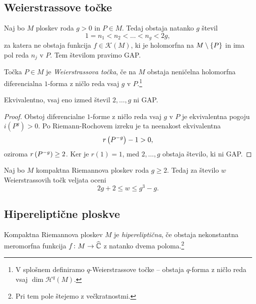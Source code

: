 
\subsection{Weierstrassove točke}

\begin{izrek}
Naj bo $M$ ploskev roda $g > 0$ in $P \in M$. Tedaj obstaja
natanko $g$ števil
\[
1 = n_1 < n_2 < \dots < n_g < 2g,
\]
za katera ne obstaja funkcija $f \in \mathscr{K}(M)$, ki je
holomorfna na $M \setminus \left\{P\right\}$ in ima pol reda $n_j$ v $P$.
Tem številom pravimo GAP.
\end{izrek}


\begin{definicija}
Točka $P \in M$ je \emph{Weierstrassova točka}, če na $M$ obstaja
neničelna holomorfna diferencialna $1$-forma z ničlo reda vsaj
$g$ v $P$.\footnote{V splošnem definiramo $q$-Weierstrassove točke
-- obstaja $q$-forma z ničlo reda vsaj $\dim \mathscr{H}^q(M)$.}
\end{definicija}

\begin{lema}
Ekvivalentno, vsaj eno izmed števil $2, \dots, g$ ni GAP.
\end{lema}

\begin{proof}
Obstoj diferencialne $1$-forme z ničlo reda vsaj $g$ v $P$ je
ekvivalentna pogoju $i(P^g) > 0$. Po Riemann-Rochovem izreku je ta
neenakost ekvivalentna
\[
r \left(P^{-g}\right) - 1 > 0,
\]
oziroma $r \left(P^{-g}\right) \geq 2$. Ker je $r(1) = 1$, med
$2, \dots, g$ obstaja število, ki ni GAP.
\end{proof}

\begin{lema}
Naj bo $M$ kompaktna Riemannova ploskev roda $g \geq 2$. Tedaj za
število $w$ Weierstrassovih točk veljata oceni
\[
2g + 2 \leq w \leq g^3 - g.
\]
\end{lema}


\subsection{Hipereliptične ploskve}

\begin{definicija}
Kompaktna Riemannova ploskev $M$ je \emph{hipereliptična}, če
obstaja nekonstantna meromorfna funkcija $f \colon M \to \widehat{\mathbb{C}}$ z
natanko dvema poloma.\footnote{Pri tem pole štejemo z
večkratnostmi.}
\end{definicija}

